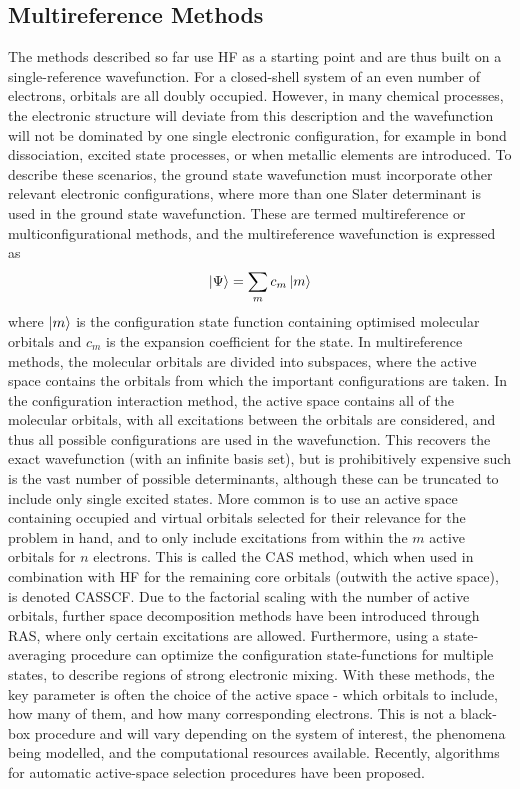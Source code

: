 \subsection{Multireference Methods}\label{section: methods_multiconf}
The methods described so far use \ac{HF} as a starting point and are thus built on a single-reference wavefunction. For a closed-shell system of an even number of electrons, orbitals are all doubly occupied. However, in many chemical processes, the electronic structure will deviate from this description and the wavefunction will not be dominated by one single electronic configuration, for example in bond dissociation, excited state processes, or when metallic elements are introduced. To describe these scenarios, the ground state wavefunction must incorporate other relevant electronic configurations, where more than one Slater determinant is used in the ground state wavefunction. These are termed multireference or multiconfigurational methods, and the multireference wavefunction is expressed as
\begin{equation}
    \ket{\Psi}=\sum_{m}c_{m}\ket{m}
\end{equation}
where $\ket{m}$ is the configuration state function containing optimised molecular orbitals and $c_{m}$ is the expansion coefficient for the state. In multireference methods, the molecular orbitals are divided into subspaces, where the active space contains the orbitals from which the important configurations are taken. In the configuration interaction method, the active space contains all of the molecular orbitals, with all excitations between the orbitals are considered, and thus all possible configurations are used in the wavefunction. This recovers the exact wavefunction (with an infinite basis set), but is prohibitively expensive such is the vast number of possible determinants, although these can be truncated to include only single excited states. More common is to use an active space containing occupied and virtual orbitals selected for their relevance for the problem in hand, and to only include excitations from within the $m$ active orbitals for $n$  electrons. This is called the \ac{CAS} method, which when used in combination with \ac{HF} for the remaining core orbitals (outwith the active space), is denoted \ac{CASSCF}.\cite{Roos1980} Due to the factorial scaling with the number of active orbitals, further space decomposition methods have been introduced through \ac{RAS}, where only certain excitations are allowed. Furthermore, using a state-averaging procedure can optimize the configuration state-functions for multiple states, to describe regions of strong electronic mixing. With these methods, the key parameter is often the choice of the active space - which orbitals to include, how many of them, and how many corresponding electrons. This is not a black-box procedure and will vary depending on the system of interest, the phenomena being modelled, and the computational resources available.\cite{Lischka2018} Recently, algorithms for automatic active-space selection procedures have been proposed.\cite{Stein2016,Bao2018}

